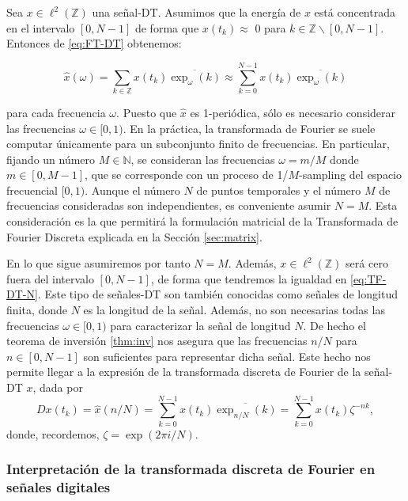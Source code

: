 \documentclass{article}
\begin{document}
Sea $x\in\ell^2(\mathbb{Z})$ una señal-DT. Asumimos que la energía de $x$ está concentrada en el intervalo $[0, N-1]$ de forma que $x(t_k)\approx$ 0 para $k\in\mathbb{Z}\backslash[0, N-1]$. Entonces de \eqref{eq:FT-DT} obtenemos:

\begin{equation}\label{eq:TF-DT-N}
    \hat{x}(\omega)=\sum_{k\in\mathbb{Z}}x(t_k)\overline{\exp_\omega(k)}\approx\sum_{k=0}^{N-1}x(t_k)\overline{\exp_\omega(k)}
\end{equation}

para cada frecuencia $\omega$. Puesto que $\hat{x}$ es 1-periódica, sólo es necesario considerar las frecuencias $\omega\in[0,1)$. En la práctica, la transformada de Fourier se suele computar únicamente para un subconjunto finito de frecuencias. En particular, fijando un número $M\in\mathbb{N}$, se consideran las frecuencias $\omega=m/M$ donde $m\in[0,M-1]$, que se corresponde con un proceso de 1/$M$-sampling del espacio frecuencial $[0,1)$. Aunque el número $N$ de puntos temporales y el número $M$ de frecuencias consideradas son independientes, es conveniente asumir $N=M$. Esta consideración es la que permitirá la formulación matricial de la Transformada de Fourier Discreta explicada en la Sección \ref{sec:matrix}.

En lo que sigue asumiremos por tanto $N=M$. Además, $x\in\ell^2(\mathbb{Z})$ será cero fuera del intervalo $[0,N-1]$, de forma que tendremos la igualdad en \eqref{eq:TF-DT-N}. Este tipo de señales-DT son también conocidas como señales de longitud finita, donde $N$ es la longitud de la señal. Además, no son necesarias todas las frecuencias $\omega\in[0,1)$ para caracterizar la señal de longitud $N$. De hecho el teorema de inversión \ref{thm:inv} nos asegura que las frecuencias $n/N$ para $n\in[0,N-1]$ son suficientes para representar dicha señal. Este hecho nos permite llegar a la expresión de la transformada discreta de Fourier de la señal-DT $x$, dada por
\begin{equation}\label{eq:TFD-DT}
    Dx(t_k)=\hat{x}(n/N)=\sum_{k=0}^{N-1}x(t_k)\overline{\exp_{n/N}(k)}=\sum_{k=0}^{N-1}x(t_k)\zeta^{-nk},
\end{equation}
donde, recordemos, $\zeta=\exp(2\pi i/N)$.

\subsubsection*{Interpretación de la transformada discreta de Fourier en señales digitales}
\end{document}
